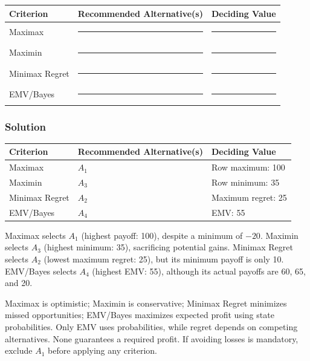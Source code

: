 \begin{center}
\begin{tabular}{lll}\toprule
Criterion & Recommended Alternative(s) & Deciding Value\\\midrule
Maximax & \rule{3cm}{0.4pt} & \rule{2cm}{0.4pt}\\
Maximin & \rule{3cm}{0.4pt} & \rule{2cm}{0.4pt}\\
Minimax Regret & \rule{3cm}{0.4pt} & \rule{2cm}{0.4pt}\\
EMV/Bayes & \rule{3cm}{0.4pt} & \rule{2cm}{0.4pt}\\\bottomrule
\end{tabular}
\end{center}
\subsubsection*{Solution}
\label{subsec:c8-worked-solution}
\begin{center}
\begin{tabular}{lll}\toprule
Criterion & Recommended Alternative(s) & Deciding Value\\\midrule
Maximax & $A_1$ & Row maximum: 100\\
Maximin & $A_3$ & Row minimum: 35\\
Minimax Regret & $A_2$ & Maximum regret: 25\\
EMV/Bayes & $A_4$ & EMV: 55\\\bottomrule
\end{tabular}
\end{center}
Maximax selects $A_1$ (highest payoff: 100), despite a minimum of $-20$. Maximin selects $A_3$ (highest minimum: 35), sacrificing potential gains. Minimax Regret selects $A_2$ (lowest maximum regret: 25), but its minimum payoff is only 10. EMV/Bayes selects $A_4$ (highest EMV: 55), although its actual payoffs are 60, 65, and 20.

Maximax is optimistic; Maximin is conservative; Minimax Regret minimizes missed opportunities; EMV/Bayes maximizes expected profit using state probabilities. Only EMV uses probabilities, while regret depends on competing alternatives. None guarantees a required profit. If avoiding losses is mandatory, exclude $A_1$ before applying any criterion.


